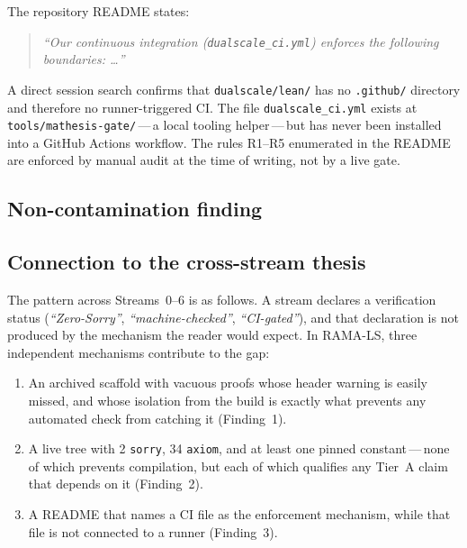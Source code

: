 \documentclass[11pt,a4paper]{article}
\theoremstyle{plain}
\theoremstyle{definition}
\theoremstyle{remark}
\begin{document}
The repository README states:
\begin{quote}
\textit{``Our continuous integration (\texttt{dualscale\_ci.yml}) enforces
the following boundaries: \ldots''}
\end{quote}

\noindent
A direct session search confirms that \texttt{dualscale/lean/} has no
\texttt{.github/} directory and therefore no runner-triggered CI.
The file \texttt{dualscale\_ci.yml} exists at
\texttt{tools/mathesis-gate/}\,---\,a local tooling helper\,---\,but
has never been installed into a GitHub Actions workflow.
The rules R1--R5 enumerated in the README are enforced by manual audit
at the time of writing, not by a live gate.

\subsection*{Non-contamination finding}

\noindent{}

\subsection*{Connection to the cross-stream thesis}

The pattern across Streams~0--6 is as follows.
A stream declares a verification status (\textit{``Zero-Sorry''},
\textit{``machine-checked''}, \textit{``CI-gated''}), and that
declaration is not produced by the mechanism the reader would expect.
In RAMA-LS, three independent mechanisms contribute to the gap:
\begin{enumerate}
  \item An archived scaffold with vacuous proofs whose header warning
    is easily missed, and whose isolation from the build is exactly what
    prevents any automated check from catching it (Finding~1).
  \item A live tree with 2 \texttt{sorry}, 34 \texttt{axiom}, and at
    least one pinned constant\,---\,none of which prevents compilation,
    but each of which qualifies any Tier~A claim that depends on it
    (Finding~2).
  \item A README that names a CI file as the enforcement mechanism,
    while that file is not connected to a runner (Finding~3).
\end{enumerate}
\end{document}
